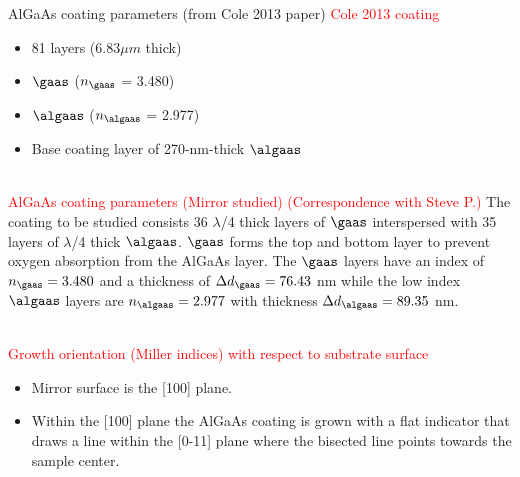 AlGaAs coating parameters (from Cole 2013 paper)
\textcolor{red}{Cole 2013 coating}
\begin{itemize}
\item 81 layers ($6.83 \mu m$ thick)
\item $\gaas$ ($n_\gaas$ = 3.480)
\item $\algaas$ ($n_\algaas$ = 2.977)
\item Base coating layer of 270-nm-thick $\algaas$
\end{itemize}
\\

\textcolor{red}{AlGaAs coating parameters (Mirror studied) (Correspondence with Steve P.)}
The coating to be studied consists 36 $\lambda$/4  thick layers of $\gaas$ interspersed with 35 layers of $\lambda$/4 thick $\algaas$.   $\gaas$ forms the top and bottom layer to prevent oxygen absorption from the AlGaAs layer. The $\gaas$ layers have an index of $n_{\gaas} = 3.480$ and a thickness of $\Delta d_{\gaas} = 76.43$ nm while the low index $\algaas$ layers are $n_{\algaas} = 2.977$ with thickness $\Delta d_{\algaas} = 89.35$ nm.

\\

\textcolor{red}{Growth orientation (Miller indices) with respect to substrate surface}

\begin{itemize}
\item Mirror surface is the [100] plane.
\item Within the [100] plane the AlGaAs coating is grown with a flat indicator that draws a line within the [0-11] plane where the bisected line points towards the sample center.
\end{itemize}
